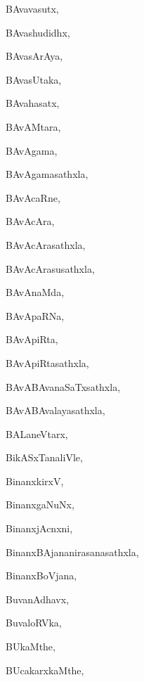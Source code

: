 \begin{multicols}{3}
{\noindent
{BAvavasutx}, \pageref{BAvavasutx}

\noindent
{BAvashudidhx}, \pageref{BAvashudidhx}

\noindent
{BAvasArAya}, \pageref{BAvasArAya}

\noindent
{BAvasUtaka}, \pageref{BAvasUtaka}

\noindent
{BAvahasatx}, \pageref{BAvahasatx}

\noindent
{BAvAMtara}, \pageref{BAvAMtara}

\noindent
{BAvAgama}, \pageref{BAvAgama}

\noindent
{BAvAgamasathxla}, \pageref{BAvAgamasathxla}

\noindent
{BAvAcaRne}, \pageref{BAvAcaRne}

\noindent
{BAvAcAra}, \pageref{BAvAcAra}

\noindent
{BAvAcArasathxla}, \pageref{BAvAcArasathxla}

\noindent
{BAvAcArasusathxla}, \pageref{BAvAcArasusathxla}

\noindent
{BAvAnaMda}, \pageref{BAvAnaMda}

\noindent
{BAvApaRNa}, \pageref{BAvApaRNa}

\noindent
{BAvApiRta}, \pageref{BAvApiRta}

\noindent
{BAvApiRtasathxla}, \pageref{BAvApiRtasathxla}

\noindent
{BAvABAvanaSaTxsathxla}, \pageref{BAvABAvanaSaTxsathxla}

\noindent
{BAvABAvalayasathxla}, \pageref{BAvABAvalayasathxla}

\noindent
{BALaneVtarx}, \pageref{BALaneVtarx}

\noindent
{BikASxTanaliVle}, \pageref{BikASxTanaliVle}

\noindent
{BinanxkirxV}, \pageref{BinanxkirxV}

\noindent
{BinanxgaNuNx}, \pageref{BinanxgaNuNx}

\noindent
{BinanxjAcnxni}, \pageref{BinanxjAcnxni}

\noindent
{BinanxBAjananirasanasathxla}, \pageref{BinanxBAjananirasanasathxla}

\noindent
{BinanxBoVjana}, \pageref{BinanxBoVjana}

\noindent
{BuvanAdhavx}, \pageref{BuvanAdhavx}

\noindent
{BuvaloRVka}, \pageref{BuvaloRVka}

\noindent
{BUkaMthe}, \pageref{BUkaMthe}

\noindent
{BUcakarxkaMthe}, \pageref{BUcakarxkaMthe}

}
\end{multicols}
